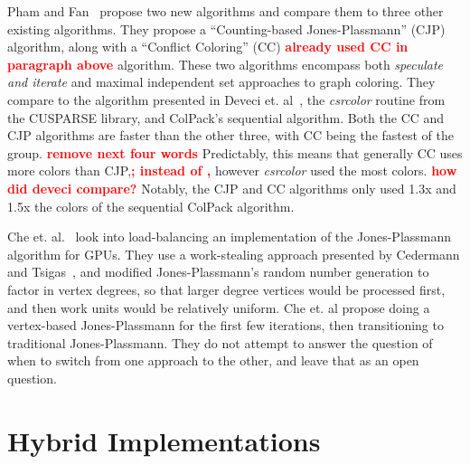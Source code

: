 \documentclass{article}
\newcommand{\todo}[1]{\textcolor{red}{\bf #1}}
\begin{document}
{{Pham and Fan~\cite{pham2018efficient} propose two new algorithms and compare them to three other existing
algorithms. They propose a ``Counting-based Jones-Plassmann'' (CJP) algorithm, along with a 
``Conflict Coloring'' (CC) \todo{already used CC in paragraph above} algorithm. These two algorithms encompass both {\it speculate and iterate} and
maximal independent set approaches to graph coloring. They compare to the algorithm presented in
Deveci et. al~\cite{deveci2016parallel}, the {\it csrcolor} routine from the CUSPARSE library, and 
ColPack's sequential algorithm. Both the CC and CJP algorithms are faster than the other three, with 
CC being the fastest of the group. \todo{remove next four words} Predictably, this means that generally CC uses more colors than CJP,\todo{; instead of ,}
however {\it csrcolor} used the most colors. \todo{how did deveci compare?} Notably, the CJP and CC algorithms only used 1.3x and 1.5x
the colors of the sequential ColPack algorithm.

Che et. al.~\cite{che2015graph} look into load-balancing an implementation of the Jones-Plassmann 
algorithm for GPUs. They use a work-stealing approach presented by Cedermann and 
Tsigas~\cite{cederman2012dynamic}, and modified Jones-Plassmann's random number generation to factor in
vertex degrees, so that larger degree vertices would be processed first, and then work units would be
relatively uniform. Che et. al propose doing a vertex-based Jones-Plassmann for the first few iterations,
then transitioning to traditional Jones-Plassmann. They do not attempt to answer the question of when to
switch from one approach to the other, and leave that as an open question.


\section{Hybrid Implementations}

}}
\end{document}
